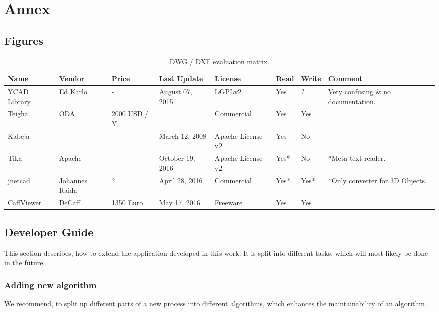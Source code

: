 \section{Annex}

\subsection{Figures}
\begin{table}[h]
\centering
\caption{DWG / DXF evaluation matrix.}
\label{tbl:DWGEvaluationMatrix}
\begin{tabular}{@{}llllllll@{}}
\toprule
Name         & Vendor         & Price        & Last Update      & License           & Read & Write & Comment                             \\ \midrule
YCAD Library & Ed Karlo       & -            & August 07, 2015  & LGPLv2            & Yes  & ?     & Very confusing \& no documentation. \\
Teigha       & ODA            & 2000 USD / Y &                  & Commercial        & Yes  & Yes   &                                     \\
Kabeja       &                & -            & March 12, 2008   & Apache License v2 & Yes  & No    &                                     \\
Tika         & Apache         & -            & October 19, 2016 & Apache License v2 & Yes* & No    & *Meta text reader.                  \\
jnetcad      & Johannes Raida & ?            & April 28, 2016   & Commercial        & Yes* & Yes*  & *Only converter for 3D Objects.     \\
CaffViewer   & DeCaff         & 1350 Euro    & May 17, 2016     & Freeware          & Yes  & Yes   &                                     \\ \bottomrule
\end{tabular}
\end{table}

\pagebreak
\subsection{Developer Guide}
This section describes, how to extend the application developed in this work. It is split into different tasks, which will most likely be done in the future.

\subsubsection{Adding new algorithm}
We recommend, to split up different parts of a new process into different algorithms, which enhances the maintainability of an algorithm.

